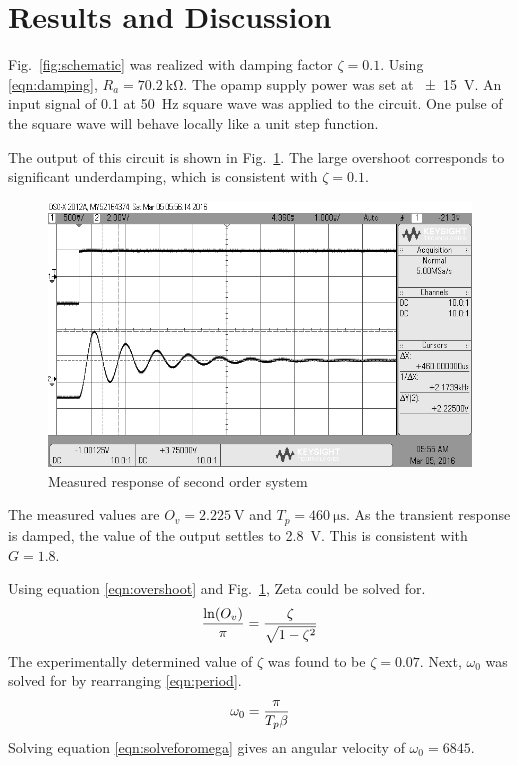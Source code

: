 \section{Results and Discussion}\label{sec:results-and-discussion}
Fig.~\ref{fig:schematic} was realized with damping factor $\zeta = 0.1$.
Using \eqref{eqn:damping}, $R_a = \SI{70.2}{\kilo\ohm}$.
The opamp supply power was set at \SI{+-15}{\volt}.
An input signal of 0.1\si{\voltpp} at \SI{50}{\hertz} square wave was applied to the circuit.
One pulse of the square wave will behave locally like a unit step function.

The output of this circuit is shown in Fig.~\ref{fig:overshoot}.
The large overshoot corresponds to significant underdamping, which is consistent with $\zeta = 0.1$.

\pagebreak

\begin{figure}[tbph]
	\centering
	\includegraphics[width=0.7\linewidth]{graphics/overshoot}
	\caption{Measured response of second order system}
	\label{fig:overshoot}
\end{figure}

The measured values are $O_v = \SI{2.225}{\volt}$ and $T_p = \SI{460}{\micro\second}$.
As the transient response is damped, the value of the output settles to \SI{2.8}{\volt}.
This is consistent with $G = 1.8$.

Using equation \eqref{eqn:overshoot} and Fig.~\ref{fig:overshoot}, Zeta could be solved for. 
\begin{equation}\label{eqn:solveforzeta}
	{\ln(O_v) \over \pi} = {\zeta \over \sqrt{1 - \zeta^2}}
\end{equation}
The experimentally determined value of $\zeta$ was found to be $\zeta = 0.07$.
Next, $\omega_0$ was solved for by rearranging \eqref{eqn:period}.
\begin{equation}\label{eqn:solveforomega}
	\omega_0 = { \pi \over T_p\beta }
\end{equation} 
Solving equation \eqref{eqn:solveforomega} gives an angular velocity of $\omega_0 = 6845$.

